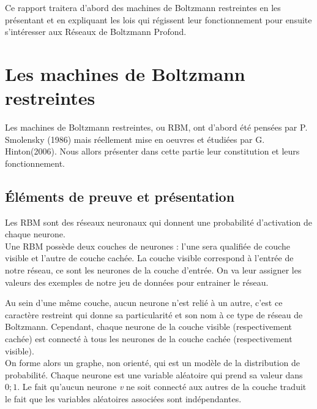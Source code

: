 \documentclass[a4paper,oneside]{report}
\begin{document}
            Ce rapport traitera d'abord des machines de Boltzmann restreintes en les
            présentant et en expliquant les lois qui régissent leur fonctionnement pour
            ensuite s'intéresser aux Réseaux de Boltzmann Profond.

        \chapter{Les machines de Boltzmann restreintes}

            Les machines de Boltzmann restreintes, ou RBM, ont d'abord été
            pensées par P. Smolensky (1986) mais réellement mise en oeuvres et
            étudiées par G.
            Hinton(2006). Nous allors présenter dans cette partie leur constitution et
            leurs fonctionnement.

            \section{Éléments de preuve et présentation}

                Les RBM sont des réseaux neuronaux qui donnent une
                probabilité d'activation de chaque neurone.\\

                Une RBM possède deux couches de neurones : l'une sera qualifiée 
                de couche visible et l'autre de couche cachée.
                La couche visible correspond à l'entrée de notre réseau, ce sont
                les neurones de la couche d'entrée. On va leur assigner les
                valeurs des exemples de notre jeu de données pour entrainer le
                réseau.

                Au sein d'une même couche, aucun neurone n'est relié à un
                autre, c'est ce caractère restreint qui donne sa particularité 
                et son nom à ce type de réseau de Boltzmann.
                Cependant, chaque neurone de la couche visible (respectivement
                cachée) est connecté à tous les neurones de la couche cachée 
                (respectivement visible).\\
                
                On forme alors un graphe, non orienté, qui est un
                modèle de la distribution de probabilité. Chaque neurone est une variable aléatoire
                qui prend sa valeur dans \begin{math}{0;1}\end{math}. Le fait
                qu'aucun neurone \textit{v} ne soit connecté aux autres de la
                couche traduit le fait que les variables aléatoires associées
                sont indépendantes.
                
\end{document}
